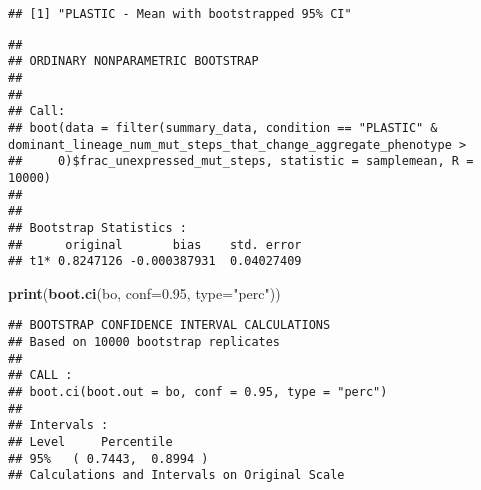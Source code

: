 \documentclass[]{book}
\newenvironment{Shaded}{\begin{snugshade}}{\end{snugshade}}
\newcommand{\DataTypeTok}[1]{\textcolor[rgb]{0.13,0.29,0.53}{#1}}
\newcommand{\DecValTok}[1]{\textcolor[rgb]{0.00,0.00,0.81}{#1}}
\newcommand{\FloatTok}[1]{\textcolor[rgb]{0.00,0.00,0.81}{#1}}
\newcommand{\KeywordTok}[1]{\textcolor[rgb]{0.13,0.29,0.53}{\textbf{#1}}}
\newcommand{\NormalTok}[1]{#1}
\newcommand{\OperatorTok}[1]{\textcolor[rgb]{0.81,0.36,0.00}{\textbf{#1}}}
\newcommand{\StringTok}[1]{\textcolor[rgb]{0.31,0.60,0.02}{#1}}
\begin{document}
\begin{verbatim}
## [1] "PLASTIC - Mean with bootstrapped 95% CI"
\end{verbatim}

\begin{Shaded}
\end{Shaded}

\begin{verbatim}
## 
## ORDINARY NONPARAMETRIC BOOTSTRAP
## 
## 
## Call:
## boot(data = filter(summary_data, condition == "PLASTIC" & dominant_lineage_num_mut_steps_that_change_aggregate_phenotype > 
##     0)$frac_unexpressed_mut_steps, statistic = samplemean, R = 10000)
## 
## 
## Bootstrap Statistics :
##      original       bias    std. error
## t1* 0.8247126 -0.000387931  0.04027409
\end{verbatim}

\begin{Shaded}
\begin{Highlighting}[]
\KeywordTok{print}\NormalTok{(}\KeywordTok{boot.ci}\NormalTok{(bo, }\DataTypeTok{conf=}\FloatTok{0.95}\NormalTok{, }\DataTypeTok{type=}\StringTok{"perc"}\NormalTok{))}
\end{Highlighting}
\end{Shaded}

\begin{verbatim}
## BOOTSTRAP CONFIDENCE INTERVAL CALCULATIONS
## Based on 10000 bootstrap replicates
## 
## CALL : 
## boot.ci(boot.out = bo, conf = 0.95, type = "perc")
## 
## Intervals : 
## Level     Percentile     
## 95%   ( 0.7443,  0.8994 )  
## Calculations and Intervals on Original Scale
\end{verbatim}

\begin{Shaded}
\end{Shaded}
\end{document}
